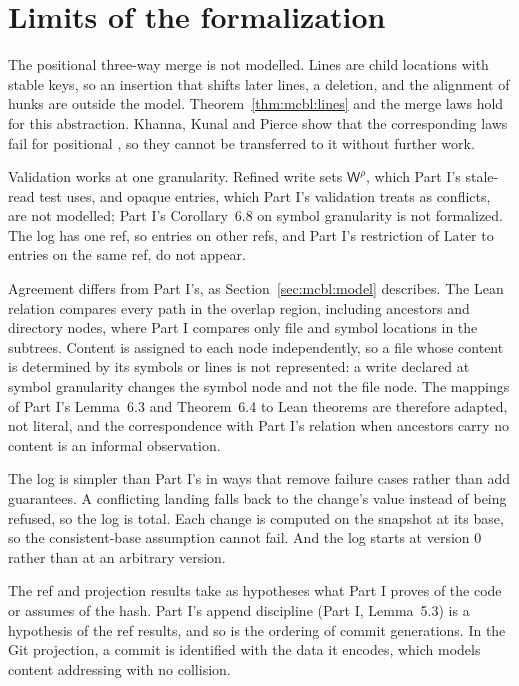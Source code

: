 \documentclass[11pt,letterpaper]{article}
\theoremstyle{definition}
\theoremstyle{remark}
\newcommand{\W}{\mathsf{W}}
\newcommand{\Later}{\mathrm{Later}}
\begin{document}
\section{Limits of the formalization}
\label{sec:mcbl:limits}

The positional three-way merge is not modelled. Lines are child locations with stable keys, so an insertion that shifts later lines, a deletion, and the alignment of hunks are outside the model. Theorem~\ref{thm:mcbl:lines} and the merge laws hold for this abstraction. Khanna, Kunal and Pierce show that the corresponding laws fail for positional  \cite{khanna2007diff3}, so they cannot be transferred to it without further work.

Validation works at one granularity. Refined write sets $\W^\rho$, which Part I's stale-read test uses, and opaque entries, which Part I's validation treats as conflicts, are not modelled; Part I's Corollary~6.8 on symbol granularity is not formalized. The log has one ref, so entries on other refs, and Part I's restriction of $\Later$ to entries on the same ref, do not appear.

Agreement differs from Part I's, as Section~\ref{sec:mcbl:model} describes. The Lean relation compares every path in the overlap region, including ancestors and directory nodes, where Part I compares only file and symbol locations in the subtrees. Content is assigned to each node independently, so a file whose content is determined by its symbols or lines is not represented: a write declared at symbol granularity changes the symbol node and not the file node. The mappings of Part I's Lemma~6.3 and Theorem~6.4 to Lean theorems are therefore adapted, not literal, and the correspondence with Part I's relation when ancestors carry no content is an informal observation.

The log is simpler than Part I's in ways that remove failure cases rather than add guarantees. A conflicting landing falls back to the change's value instead of being refused, so the log is total. Each change is computed on the snapshot at its base, so the consistent-base assumption cannot fail. And the log starts at version 0 rather than at an arbitrary version.

The ref and projection results take as hypotheses what Part I proves of the code or assumes of the hash. Part I's append discipline (Part I, Lemma~5.3) is a hypothesis of the ref results, and so is the ordering of commit generations. In the Git projection, a commit is identified with the data it encodes, which models content addressing with no collision.
\end{document}
